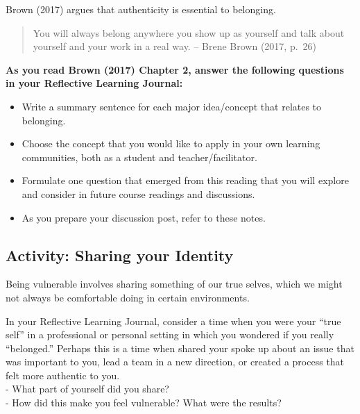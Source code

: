 \documentclass[
]{book}
\providecommand{\tightlist}{%
  \setlength{\itemsep}{0pt}\setlength{\parskip}{0pt}}
\begin{document}
\begin{reflect}
Brown (2017) argues that authenticity is essential to belonging.

\begin{quote}
You will always belong anywhere you show up as yourself and talk about yourself and your work in a real way. -- Brene Brown (2017, p.~26)
\end{quote}

\textbf{As you read Brown (2017) Chapter 2, answer the following questions in your Reflective Learning Journal:}

\begin{itemize}
\tightlist
\item
  Write a summary sentence for each major idea/concept that relates to belonging.\\
\item
  Choose the concept that you would like to apply in your own learning communities, both as a student and teacher/facilitator.\\
\item
  Formulate one question that emerged from this reading that you will explore and consider in future course readings and discussions.\\
\item
  As you prepare your discussion post, refer to these notes.
\end{itemize}
\end{reflect}

\hypertarget{activity-sharing-your-identity}{%
\subsection*{Activity: Sharing your Identity}\label{activity-sharing-your-identity}}

\begin{reflect}
Being vulnerable involves sharing something of our true selves, which we might not always be comfortable doing in certain environments.

In your Reflective Learning Journal, consider a time when you were your ``true self'' in a professional or personal setting in which you wondered if you really ``belonged.'' Perhaps this is a time when shared your spoke up about an issue that was important to you, lead a team in a new direction, or created a process that felt more authentic to you.\\
- What part of yourself did you share?\\
- How did this make you feel vulnerable? What were the results?
\end{reflect}
\end{document}
